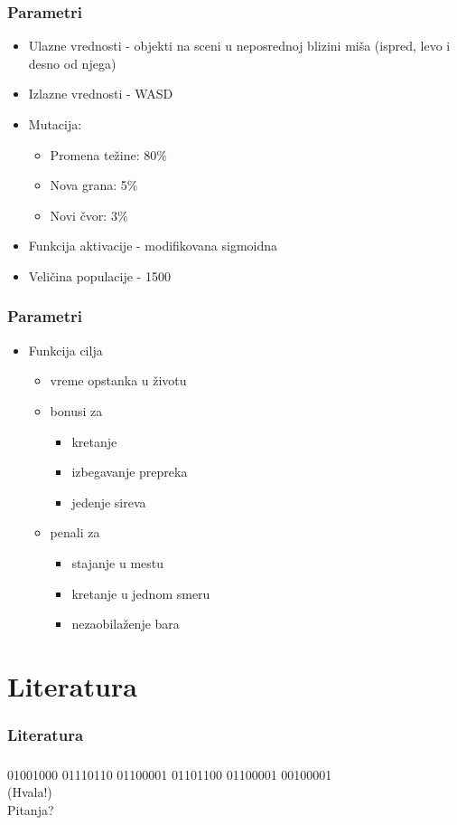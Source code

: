 \documentclass{beamer}
\begin{document}
\begin{frame} 
\frametitle{Parametri}
\begin{itemize}
\item Ulazne vrednosti - objekti na sceni u neposrednoj blizini miša (ispred, levo i desno od njega)
\item Izlazne vrednosti - WASD
\item Mutacija:
\begin{itemize}
\item Promena težine: 80\%
\item Nova grana: 5\%
\item Novi čvor: 3\%
\end{itemize}
\item Funkcija aktivacije - modifikovana sigmoidna
\item Veličina populacije - 1500
\end{itemize}
\end{frame}

\begin{frame}
\frametitle{Parametri}
\begin{itemize}
\item Funkcija cilja
\begin{itemize}
\item vreme opstanka u životu
\item bonusi za
\begin{itemize}
\item kretanje
\item izbegavanje prepreka 
\item jedenje sireva
\end{itemize}
\item penali za
\begin{itemize}
\item stajanje u mestu
\item kretanje u jednom smeru
\item nezaobilaženje bara
\end{itemize}
\end{itemize}
\end{itemize}

\end{frame}

\section{Literatura}
\begin{frame}

\nocite{NEAT}
\nocite{ai_techs}

\frametitle{Literatura}


\end{frame}

\begin{frame}
\frametitle{}
\begin{center}
{\Huge 01001000 01110110 01100001 01101100 01100001 00100001} \\
{\Huge (Hvala!)} \\ 
\bigskip
\bigskip
{\Huge Pitanja?}
\end{center}
\end{frame}
\end{document}

